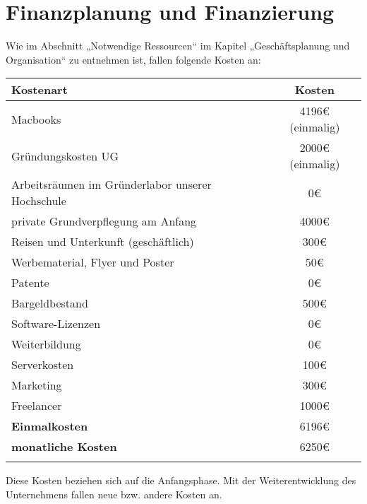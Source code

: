\chapter{Finanzplanung und Finanzierung}

Wie im Abschnitt „Notwendige Ressourcen“ im Kapitel „Geschäftsplanung und Organisation“ zu entnehmen ist, fallen folgende Kosten an: \\

\begin{tabular}{lc}
  \textbf{Kostenart} & \textbf{Kosten} \\
  \hline
  Macbooks & 4196{\euro} (einmalig) \\
  Gründungskosten UG & 2000{\euro} (einmalig) \\
  Arbeitsräumen im Gründerlabor unserer Hochschule & 0\euro \\
  private Grundverpflegung am Anfang & 4000\euro \\
  Reisen und Unterkunft (geschäftlich) & 300\euro \\
  Werbematerial, Flyer und Poster & 50\euro \\
  Patente & 0\euro \\
  Bargeldbestand & 500\euro \\
  Software-Lizenzen & 0\euro \\
  Weiterbildung & 0\euro \\
  Serverkosten & 100\euro \\
  Marketing & 300\euro \\
  Freelancer & 1000\euro \\
  \hline
  \textbf{Einmalkosten} & 6196{\euro} \\
  \textbf{monatliche Kosten} & 6250\euro \\
  \hline  \\
 \end{tabular}

Diese Kosten beziehen sich auf die Anfangsphase. Mit der Weiterentwicklung des Unternehmens fallen neue bzw. andere Kosten an.

